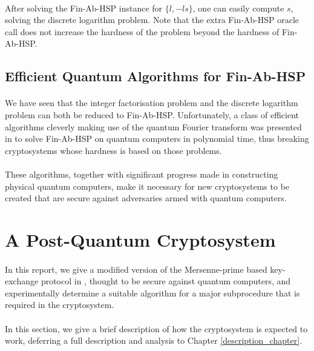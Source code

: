 \paragraph{}
After solving the Fin-Ab-HSP instance for $\{l, -ls\}$, one can easily compute $s$, solving the discrete logarithm problem. Note that the extra Fin-Ab-HSP oracle call does not increase the hardness of the problem beyond the hardness of Fin-Ab-HSP.

\subsection{Efficient Quantum Algorithms for Fin-Ab-HSP}
\paragraph{}
We have seen that the integer factorisation problem and the discrete logarithm problem can both be reduced to Fin-Ab-HSP. Unfortunately, a class of efficient algorithms cleverly making use of the quantum Fourier transform was presented in \cite{shor1994algorithms} to solve Fin-Ab-HSP on quantum computers in polynomial time, thus breaking cryptosystems whose hardness is based on those problems.

\paragraph{}
These algorithms, together with significant progress made in constructing physical quantum computers, make it necessary for new cryptosystems to be created that are secure against adversaries armed with quantum computers.

\section{A Post-Quantum Cryptosystem} \label{mersennekem_intro}
\paragraph{}
In this report, we give a modified version of the Mersenne-prime based key-exchange protocol in \cite{aggarwal2018new}, thought to be secure against quantum computers, and experimentally determine a suitable algorithm for a major subprocedure that is required in the cryptosystem.

\paragraph{}
In this section, we give a brief description of how the cryptosystem is expected to work, deferring a full description and analysis to Chapter \ref{description_chapter}.

